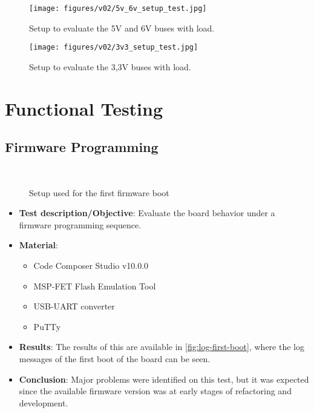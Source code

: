\begin{figure}[!ht]
    \begin{center}
        \texttt{[image: figures/v02/5v\_6v\_setup\_test.jpg]}
        \caption{Setup to evaluate the 5V and 6V buses with load.}
        \label{fig:5v_6v_setup_test}
    \end{center}
\end{figure}

\newpage

\begin{figure}[!ht]
    \begin{center}
        \texttt{[image: figures/v02/3v3\_setup\_test.jpg]}
        \caption{Setup to evaluate the 3,3V buses with load.}
        \label{fig:3v3_setup_test}
    \end{center}
\end{figure}

\section{Functional Testing}

\subsection{Firmware Programming}

\begin{figure}[!htb]
    \begin{center}
        ~
        \caption{Setup used for the first firmware boot}
        \label{fig:setup-first-boot}
    \end{center}
\end{figure}

\begin{itemize}
    \item \textbf{Test description/Objective}: Evaluate the board behavior under a firmware programming sequence.
    \item \textbf{Material}:
        \begin{itemize}
            \item Code Composer Studio v10.0.0
            \item MSP-FET Flash Emulation Tool
            \item USB-UART converter
            \item PuTTy
        \end{itemize}
    \item \textbf{Results}: The results of this are available in \autoref{fig:log-first-boot}, where the log messages of the first boot of the board can be seen.
    \item \textbf{Conclusion}: Major problems were identified on this test, but it was expected since the available firmware version was at early stages of refactoring and development.
\end{itemize}

